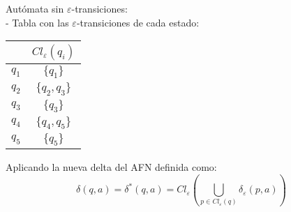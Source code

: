 \documentclass{article}
\begin{document}
\begin{enumerate}
\begin{enumerate}
\begin{center}
        \end{center}
        
        Autómata sin $\varepsilon$-transiciones:\\
        - Tabla con las $\varepsilon$-transiciones de cada estado:
        
        \begin{center}
            \begin{tabular}{c|c}
                & $Cl_{\varepsilon}(q_i)$ \\
                \hline
                $q_1$ & $\{q_1\}$ \\
                $q_2$ & $\{q_2,q_3\}$ \\
                $q_3$ & $\{q_3\}$ \\
                $q_4$ & $\{q_4,q_5\}$ \\
                $q_5$ & $\{q_5\}$ \\
            \end{tabular}
        \end{center}
        Aplicando la nueva delta del AFN definida como: 
        $$\delta(q,a) = \delta^*(q,a) = Cl_{\varepsilon}(\bigcup_{p \in Cl_{\varepsilon}(q)} \delta_{\varepsilon}(p,a))$$


\end{enumerate}
\end{enumerate}
\end{document}
